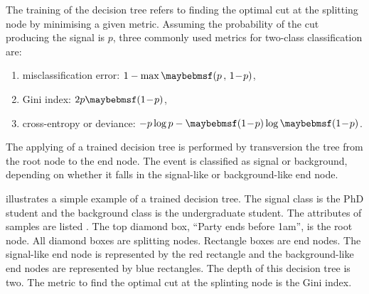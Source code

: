 

The training of the decision tree refers to finding the optimal cut at the splitting node by minimising a given metric. Assuming the probability of the cut producing the signal is $p$, three commonly used metrics for two-class classification are:
\begin{enumerate}
\item misclassification error:  $1 - \max\parenths{p\,,\,1\!-\!p}$,
\item Gini index: $2p\parenths{1\!-\!p}$,
\item cross-entropy or deviance: $-p\log{p}-\parenths{1\!-\!p}\log\parenths{1\!-\!p}$.
\end{enumerate}

The applying of a trained decision tree is performed by transversion the tree from the root node to the end node. The event is classified as signal or background, depending on whether it falls in the signal-like or background-like end node.



 illustrates a simple example of a trained decision tree. The signal class is the PhD student and the background class is the undergraduate student. The attributes of samples are listed . The top diamond box,   ``Party ends before  1am'', is the root node. All diamond boxes are splitting nodes. Rectangle boxes are end nodes.  The signal-like end node is represented by the red rectangle and the background-like end nodes are represented by blue rectangles. The depth of this decision tree is two. The metric to find the optimal cut at the splinting node is the Gini index.

